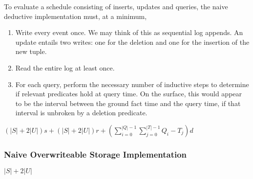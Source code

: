 To evaluate a schedule consisting of inserts, updates and queries, the naive deductive implementation must,
at a minimum,
\begin{enumerate}
\item Write every event once.  We may think of this as sequential log appends.  An update entails two writes: one for the deletion
and one for the insertion of the new tuple.
\item Read the entire log at least once.
\item For each query, perform the necessary number of inductive steps to determine if relevant predicates hold at query time.
On the surface, this would appear to be the interval between the ground fact time and the query time, if that interval is unbroken
by a deletion predicate.
\end{enumerate}

$(|S|+2|U|)s + (|S|+2|U|)r + (\displaystyle\sum_{i=0}^{|Q|-1} \displaystyle\sum_{j=0}^{|T|-1} Q_{i} - T_{j})d$

\subsubsection{Naive Overwriteable Storage Implementation}

$|S| + 2|U|$

